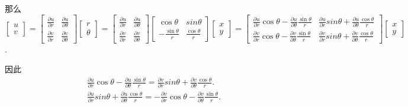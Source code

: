 \documentclass{homework}
\begin{document}
那么 \(\begin{bmatrix}
  u\\
  v
\end{bmatrix}=\begin{bmatrix}
  \frac{\partial u}{\partial r} & \frac{\partial u}{\partial\theta}\\
  \frac{\partial v}{\partial r} & \frac{\partial v}{\partial\theta}
\end{bmatrix}\begin{bmatrix}
  r\\
  \theta
\end{bmatrix}=\begin{bmatrix}
  \frac{\partial u}{\partial r} & \frac{\partial u}{\partial\theta}\\
  \frac{\partial v}{\partial r} & \frac{\partial v}{\partial\theta}
\end{bmatrix}\begin{bmatrix}
  \cos\theta & sin\theta\\
  -\frac{\sin\theta}{r} & \frac{\cos\theta}{r}
\end{bmatrix}\begin{bmatrix}
  x\\
  y
\end{bmatrix}=\begin{bmatrix}
  \frac{\partial u}{\partial r}\cos\theta-\frac{\partial u}{\partial\theta}\frac{\sin\theta}{r} & \frac{\partial u}{\partial r}sin\theta+\frac{\partial u}{\partial\theta}\frac{\cos\theta}{r}\\
  \frac{\partial v}{\partial r}\cos\theta-\frac{\partial v}{\partial\theta}\frac{\sin\theta}{r} & \frac{\partial v}{\partial r}sin\theta+\frac{\partial v}{\partial\theta}\frac{\cos\theta}{r}
\end{bmatrix}\begin{bmatrix}
  x\\
  y
\end{bmatrix}\).

因此
\begin{gather}
  \frac{\partial u}{\partial r}\cos\theta-\frac{\partial u}{\partial\theta}\frac{\sin\theta}{r}=\frac{\partial v}{\partial r}sin\theta+\frac{\partial v}{\partial\theta}\frac{\cos\theta}{r}.\label{a}\\
  \frac{\partial u}{\partial r}sin\theta+\frac{\partial u}{\partial\theta}\frac{\cos\theta}{r}=-\frac{\partial v}{\partial r}\cos\theta-\frac{\partial v}{\partial\theta}\frac{\sin\theta}{r}.\label{b}
\end{gather}
\end{document}
